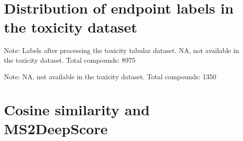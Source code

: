\appendix
{}
\renewcommand{\thetable}{A.\arabic{table}}
\renewcommand{\thefigure}{A.\arabic{figure}}

\section{Distribution of endpoint labels in the toxicity dataset}
\label{appendix:endpoint_labels}

\begin{table}[H]
\centering
\footnotesize
{}
\caption*{Note: Labels after processing the toxicity tabular dataset. NA, not available in the toxicity dataset. Total compounds: 8975}
\end{table}

\begin{table}[h]
\centering
\footnotesize
{}
\caption*{Note: NA, not available in the toxicity dataset. Total compounds: 1350}
\end{table}

\newpage
{}
\section{Cosine similarity and MS2DeepScore}
\label{appendix:Cosine similarity and MS2DeepScore}

